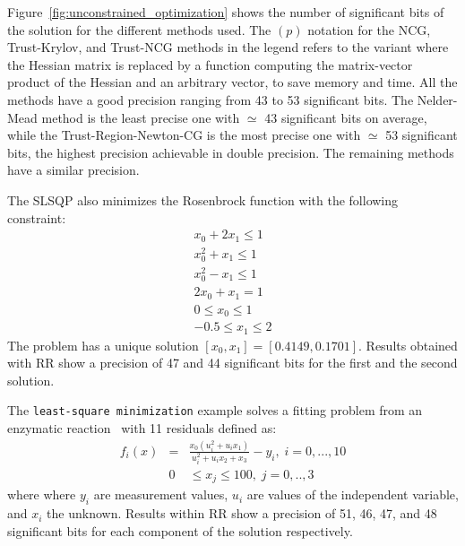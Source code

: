 \documentclass[11pt]{article}
\newcommand{\tristan}[1]{\color{orange}\textbf{From Tristan:} #1\color{black}\xspace}
\newcommand{\Yohan}[1]{\color{green!75!black}\textbf{Yohan:} #1\color{black}\xspace}
\begin{document}
Figure~\ref{fig:unconstrained_optimization} shows the number of significant bits of the solution for the different methods used. 
The $(p)$ notation for the NCG, Trust-Krylov, and Trust-NCG methods in the legend refers 
to the variant where the Hessian matrix is replaced by 
a function computing the matrix-vector product of the Hessian and an arbitrary vector, to save memory and time.
All the methods have a good precision ranging from 43 to 53 significant bits. The Nelder-Mead method is the least precise one with $\simeq$ 43 significant bits on average, while the Trust-Region-Newton-CG is the most precise one with $\simeq$ 53 significant bits, the highest precision achievable in double precision. The remaining methods have a similar precision. 

The SLSQP also minimizes the Rosenbrock function with the following constraint:
\begin{eqnarray*}
    x_0 + 2x_1 \leq 1 \\
    x_0^2 + x_1 \leq 1 \\
    x_0^2 - x_1 \leq 1 \\
    2x_0 + x_1 = 1 \\
    0 \leq x_0 \leq 1 \\
    -0.5 \leq x_1 \leq 2 
\end{eqnarray*}
The problem has a unique solution $[x_0, x_1] = [0.4149, 0.1701]$.
Results obtained with RR show a precision of 47 and 44 significant bits for the first and the second solution. %

The \texttt{least-square minimization} example solves a fitting problem from an enzymatic reaction~\cite{kowalik1968analysis} with 11 residuals defined as:
\begin{eqnarray*}
f_i(x) &=& \frac{x_0(u_i^2 + u_ix_1)}{u_i^2 + u_ix_2+x_3}-y_i,\; i=0,...,10 \\
&0& \leq x_j \leq 100,\; j=0,..,3
\end{eqnarray*}
where where $y_i$ are measurement values, $u_i$ are values of the independent variable, and
$x_i$ the unknown.
Results within RR show a precision of 51, 46, 47, and 48 significant bits for each component of the solution respectively.%
\end{document}
